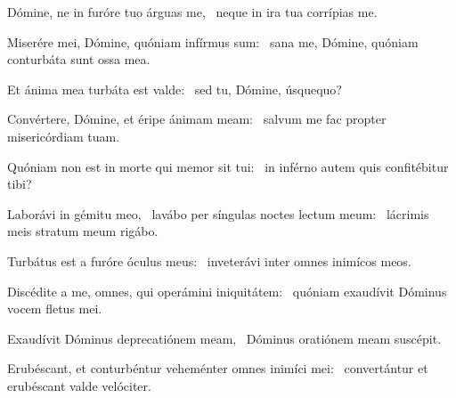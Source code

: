 \item Dómine, ne in furóre tuo árguas me,~\psstar{} neque in ira tua corrípias me.

\item Miserére mei, Dómine, quóniam infírmus sum:~\psstar{} sana me, Dómine, quóniam conturbáta sunt ossa mea.

\item Et ánima mea turbáta est valde:~\psstar{} sed tu, Dómine, úsquequo?

\item Convértere, Dómine, et éripe ánimam meam:~\psstar{} salvum me fac propter misericórdiam tuam.

\item Quóniam non est in morte qui memor sit tui:~\psstar{} in inférno autem quis confitébitur tibi?

\item Laborávi in gémitu meo,~\pscross{} la\-vábo per síngulas noctes lectum meum:~\psstar{} lácrimis meis stratum meum rigábo.

\item Turbátus est a furóre óculus meus:~\psstar{} inveterávi inter omnes inimícos meos.

\item Discédite a me, omnes, qui operámini iniquitátem:~\psstar{} quóniam exaudívit Dóminus vocem fletus mei.

\item Exaudívit Dóminus deprecatiónem meam,~\psstar{} Dóminus oratiónem meam suscépit.

\item Erubéscant, et conturbéntur veheménter omnes inimíci mei:~\psstar{} convertántur et erubéscant valde velóciter.

